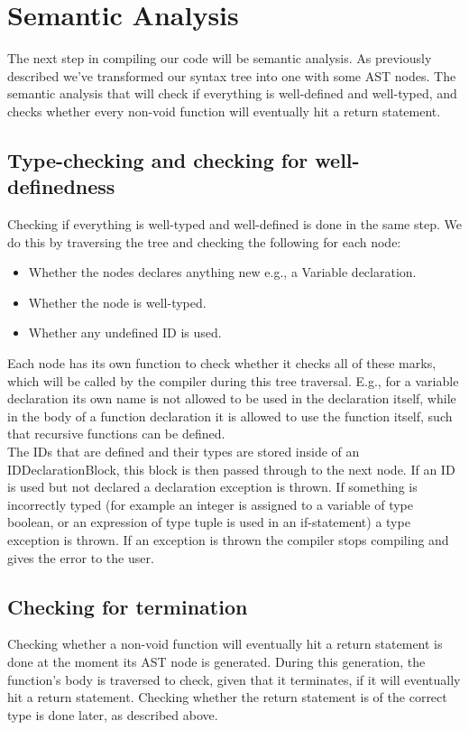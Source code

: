 \documentclass[10pt,a4paper]{article}
\begin{document}
\section{Semantic Analysis}
The next step in compiling our code will be semantic analysis. As previously described we've transformed our syntax tree into one with some AST nodes. The semantic analysis that will check if everything is well-defined and well-typed, and checks whether every non-void function will eventually hit a return statement.
\subsection{Type-checking and checking for well-definedness}
Checking if everything is well-typed and well-defined is done in the same step. We do this by traversing the tree and checking the following for each node:
\begin{itemize}
\item Whether the nodes declares anything new e.g., a Variable declaration.
\item Whether the node is well-typed.
\item Whether any undefined ID is used.
\end{itemize}
Each node has its own function to check whether it checks all of these marks, which will be called by the compiler during this tree traversal. E.g., for a variable declaration its own name is not allowed to be used in the declaration itself, while in the body of a function declaration it is allowed to use the function itself, such that recursive functions can be defined.\\
The IDs that are defined and their types are stored inside of an IDDeclarationBlock, this block is then passed through to the next node. If an ID is used but not declared a declaration exception is thrown. If something is incorrectly typed (for example an integer is assigned to a variable of type boolean, or an expression of type tuple is used in an if-statement) a type exception is thrown. If an exception is thrown the compiler stops compiling and gives the error to the user.
\subsection{Checking for termination}
Checking whether a non-void function will eventually hit a return statement is done at the moment its AST node is generated. During this generation, the function's body is traversed to check, given that it terminates, if it will eventually hit a return statement. Checking whether the return statement is of the correct type is done later, as described above.
\end{document}
